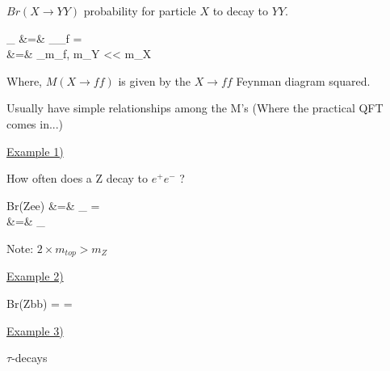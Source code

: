 {$Br(X\rightarrow YY)$ probability for particle $X$ to decay to $YY$.

\bea
{}_{}  &=&  _{\sum_f } =  \\
&=& _{m_f, m_Y << m_X}
\eea


Where, $M(X\rightarrow ff)$ is given by the $X\rightarrow ff$ Feynman diagram squared. 

Usually have simple relationships among the M's
(Where the practical QFT comes in...)

\clearpage

\underline{Example 1)}

How often does a Z decay to $e^+e^-$ ?

\bea
Br(Z\rightarrow ee)  &=&    \underbrace{=}_{}   = \\
&=& _{}
\eea

Note: $2\times m_{top} > m_Z$ 


\underline{Example 2)}

\be
Br(Z\rightarrow bb)  =     = 
\ee


\clearpage

\underline{Example 3)}

$\tau$-decays

}
